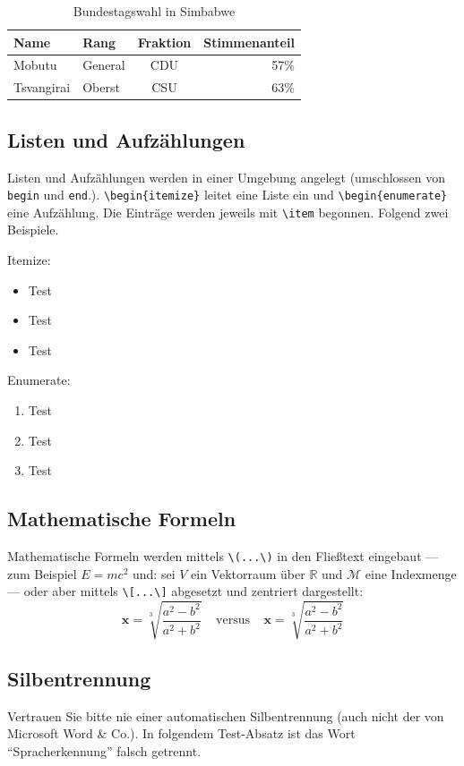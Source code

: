 \begin{table}[h]
\centering
\begin{tabular} {llcr}
	\toprule
	Name & Rang & Fraktion & Stimmenanteil \\
	\midrule
	Mobutu & General & CDU & 57\% \\
	Tsvangirai & Oberst & CSU & 63\% \\
	\bottomrule
\end{tabular}
\caption {Bundestagswahl in Simbabwe}
\label{tab:booktab}
\end{table}

\subsection{Listen und Aufzählungen}

Listen und Aufzählungen werden in einer Umgebung angelegt (umschlossen von \verb|begin| und \verb|end|.). \verb|\begin{itemize}| leitet eine Liste ein und \verb|\begin{enumerate}| eine Aufzählung. Die Einträge werden jeweils mit \verb|\item| begonnen. Folgend zwei Beispiele.

Itemize:
\begin{itemize}
\item Test
\item Test
\item Test
\end{itemize}

Enumerate:
\begin{enumerate}
\item Test
\item Test
\item Test
\end{enumerate}

\subsection{Mathematische Formeln}

Mathematische Formeln werden mittels \verb|\(...\)|
in den Fließtext eingebaut
--- zum Beispiel \( E=mc^2 \) und:
sei \(V\) ein Vektorraum über \(\mathbb{R}\)
und \(\mathcal{M}\) eine Indexmenge
---
oder aber mittels \verb|\[...\]|
abgesetzt und zentriert dargestellt:
	\[
	\pmb{x} = \sqrt[3]{\frac{a^2-b^2}{a^2+b^2}}
		~~~~~ \text{versus} ~~~~~
	\boldsymbol{x} = \sqrt[3]{\frac{a^2-b^2}{a^2+b^2}}
	\]


\subsection{Silbentrennung}
Vertrauen Sie bitte nie einer automatischen Silbentrennung (auch nicht der von Microsoft Word \& Co.). In folgendem Test-Absatz ist das Wort "`Spracherkennung"' falsch getrennt.

